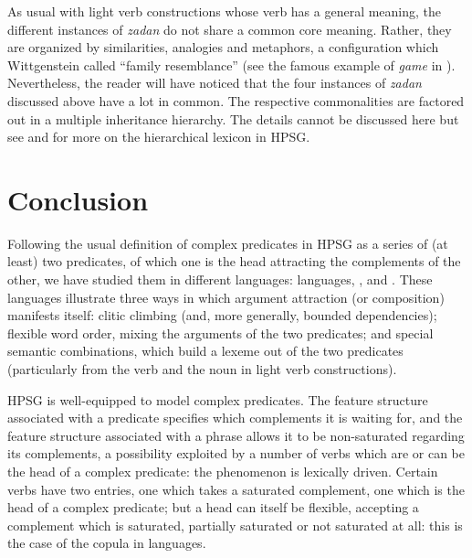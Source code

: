 \ea
\label{GSexemple82}
\z

\noindent
As usual with light verb constructions whose verb has a general meaning, the different instances of \emph{zadan} do not share a common core meaning. Rather, they are organized by similarities, analogies and metaphors, a configuration which Wittgenstein  called ``family resemblance'' (see the famous example of \emph{game} in \citealt[§66--67]{Wittgenstein2001a-u}). Nevertheless, the reader will have noticed that the four instances of \emph{zadan} discussed above have a lot in
common. The respective commonalities are factored out in a multiple inheritance hierarchy. The
details cannot be discussed here but see  and
 for more on the hierarchical lexicon in HPSG.

\section{Conclusion}\label{GSsection6}

Following the usual definition of complex predicates in HPSG as a series of (at least) two predicates, of which one is the head attracting the complements of the other, we have studied them in different languages:  languages, ,  and . These languages illustrate three ways in which argument attraction (or composition) manifests itself: clitic climbing (and, more generally, bounded dependencies); flexible word order, mixing the arguments of the two predicates; and special semantic combinations, which build a lexeme out of the two predicates (particularly from the verb and the noun in light verb constructions). 

HPSG is well-equipped to model complex predicates. The feature structure associated with a predicate specifies which complements it is waiting for, and the feature structure associated with a phrase allows it to be non-saturated regarding its complements, a possibility exploited by a number of verbs which are or can be the head of a complex predicate: the phenomenon is lexically driven. Certain verbs have two entries, one which takes a saturated complement, one which is the head of a complex predicate; but a head can itself be flexible, accepting a complement which is saturated, partially saturated or not saturated at all: this is the case of the copula in  languages.

